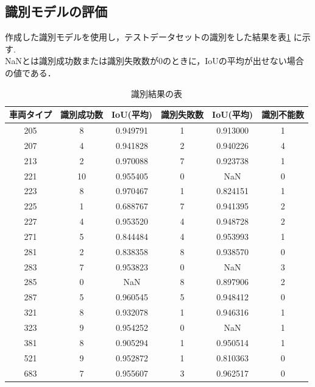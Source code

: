 \subsection{識別モデルの評価}
作成した識別モデルを使用し，テストデータセットの識別をした結果を表\ref{tab:identification_results} に示す.\\
NaNとは識別成功数または識別失敗数が0のときに，IoUの平均が出せない場合の値である．
\begin{table}[htbp] 
	\centering
	\begin{tabular}{cccccc}
		\hline
		車両タイプ & 識別成功数 & IoU(平均) & 識別失敗数 & IoU(平均) & 識別不能数 \\
		\hline \hline
		\hline
		205 & 8 & 0.949791 & 1 & 0.913000 & 1 \\
		207 & 4 & 0.941828 & 2 & 0.940226 & 4 \\
		213 & 2 & 0.970088 & 7 & 0.923738 & 1 \\
		221 & 10 & 0.955405 & 0 & NaN & 0 \\
		223 & 8 & 0.970467 & 1 & 0.824151 & 1 \\
		225 & 1 & 0.688767 & 7 & 0.941395 & 2 \\
		227 & 4 & 0.953520 & 4 & 0.948728 & 2 \\
		271 & 5 & 0.844484 & 4 & 0.953993 & 1 \\
		281 & 2 & 0.838358 & 8 & 0.938570 & 0 \\
		283 & 7 & 0.953823 & 0 & NaN & 3 \\
		285 & 0 & NaN & 8 & 0.897906 & 2 \\
		287 & 5 & 0.960545 & 5 & 0.948412 & 0 \\
		321 & 8 & 0.932078 & 1 & 0.946316 & 1 \\
		323 & 9 & 0.954252 & 0 & NaN & 1 \\
		381 & 8 & 0.905294 & 1 & 0.950514 & 1 \\
		521 & 9 & 0.952872 & 1 & 0.810363 & 0 \\
		683 & 7 & 0.955607 & 3 & 0.962517 & 0 \\
		\hline
	\end{tabular}
	\caption{識別結果の表}
	\label{tab:identification_results}
\end{table}

